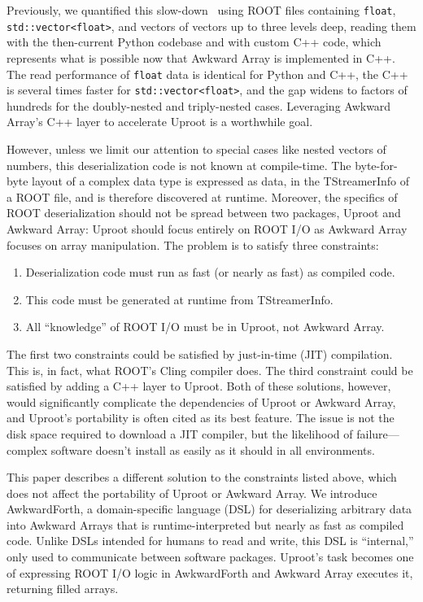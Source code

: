 \documentclass{webofc}
\begin{document}
Previously, we quantified this slow-down~\cite{chep2019} using ROOT files containing \texttt{float}, \texttt{std::vector<float>}, and vectors of vectors up to three levels deep, reading them with the then-current Python codebase and with custom C++ code, which represents what is possible now that Awkward Array is implemented in C++. The read performance of \texttt{float} data is identical for Python and C++, the C++ is several times faster for \texttt{std::vector<float>}, and the gap widens to factors of hundreds for the doubly-nested and triply-nested cases. Leveraging Awkward Array's C++ layer to accelerate Uproot is a worthwhile goal.

However, unless we limit our attention to special cases like nested vectors of numbers, this deserialization code is not known at compile-time. The byte-for-byte layout of a complex data type is expressed as data, in the TStreamerInfo of a ROOT file, and is therefore discovered at runtime. Moreover, the specifics of ROOT deserialization should not be spread between two packages, Uproot and Awkward Array: Uproot should focus entirely on ROOT I/O as Awkward Array focuses on array manipulation. The problem is to satisfy three constraints:
\begin{enumerate}
\item Deserialization code must run as fast (or nearly as fast) as compiled code.
\item This code must be generated at runtime from TStreamerInfo.
\item All ``knowledge'' of ROOT I/O must be in Uproot, not Awkward Array.
\end{enumerate}

The first two constraints could be satisfied by just-in-time (JIT) compilation. This is, in fact, what ROOT's Cling compiler does. The third constraint could be satisfied by adding a C++ layer to Uproot. Both of these solutions, however, would significantly complicate the dependencies of Uproot or Awkward Array, and Uproot's portability is often cited as its best feature. The issue is not the disk space required to download a JIT compiler, but the likelihood of failure---complex software doesn't install as easily as it should in all environments.

This paper describes a different solution to the constraints listed above, which does not affect the portability of Uproot or Awkward Array. We introduce AwkwardForth, a domain-specific language (DSL) for deserializing arbitrary data into Awkward Arrays that is runtime-interpreted but nearly as fast as compiled code. Unlike DSLs intended for humans to read and write, this DSL is ``internal,'' only used to communicate between software packages. Uproot's task becomes one of expressing ROOT I/O logic in AwkwardForth and Awkward Array executes it, returning filled arrays.
\end{document}
